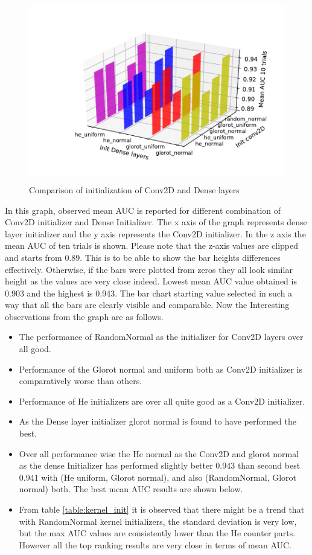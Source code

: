 \begin{figure}[ht]
\centering
\includegraphics[height= 8cm]{images/contrastive/3DbarGraph}
\caption{Comparison of initialization of Conv2D and Dense layers}
\label{fig:3DbarGraph_initialization}
\end{figure}
In this graph, observed mean AUC is reported for different combination of Conv2D initializer and Dense Initializer. The x axis of the graph represents dense layer initializer 
and the y axis represents the Conv2D initializer. In the z axis the mean AUC of ten trials is shown. Please note that the z-axis values are clipped and starts from 0.89. This is 
to be able to show the bar heights differences effectively. Otherwise, if the bars were plotted from zeros they all look similar height as the values are very close indeed.
Lowest mean AUC value obtained is 0.903 and the highest is 0.943. The bar chart starting value selected in such a way that all the bars are clearly visible and comparable.
Now the Interesting observations from the graph are as follows.

\begin{itemize}
 \item The performance of RandomNormal as the initializer for Conv2D layers over all good.
 \item Performance of the Glorot normal and uniform both as Conv2D initializer is comparatively worse than others.
 \item Performance of He initializers are over all quite good as a Conv2D initializer. 
 \item As the Dense layer initializer glorot normal is found to have performed the best.
 \item Over all performance wise the He normal as the Conv2D and glorot normal as the dense Initializer has performed slightly better 0.943 than second best 0.941 with 
 (He uniform, Glorot normal), and also (RandomNormal, Glorot normal) both. The best mean AUC results are shown below.  
 \item From table \ref{table:kernel_init} it is observed that there might be a trend that with RandomNormal kernel initializers, the standard deviation is very low, but the 
 max AUC values are consistently lower than the He counter parts. However all the top ranking results are very close in terms of mean AUC.
\end{itemize}

